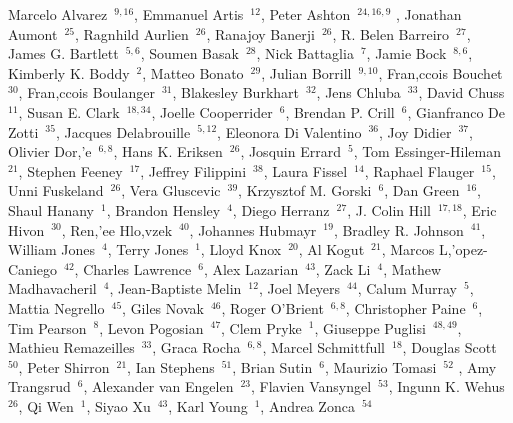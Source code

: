 \documentclass[17pt]{extarticle}
\begin{document}
\small{
Marcelo Alvarez~$^{9,16}$,
Emmanuel Artis~$^{12}$,
Peter Ashton~$^{24,16,9}$ ,
Jonathan Aumont~$^{25}$,
Ragnhild Aurlien~$^{26}$,
Ranajoy Banerji~$^{26}$,
R. Belen Barreiro~$^{27}$,
James G. Bartlett~$^{5,6}$,
Soumen Basak~$^{28}$,
Nick Battaglia~$^{7}$,
Jamie Bock~$^{8,6}$,
Kimberly K. Boddy~$^{2}$,
Matteo Bonato~$^{29}$,
Julian Borrill~$^{9,10}$,
Fran,c{c}ois Bouchet~$^{30}$,
Fran,c{c}ois Boulanger~$^{31}$,
Blakesley Burkhart~$^{32}$,
Jens Chluba~$^{33}$,
David Chuss~$^{11}$,
Susan E. Clark~$^{18,34}$,
Joelle Cooperrider~$^{6}$,
Brendan P. Crill~$^{6}$,
Gianfranco De Zotti~$^{35}$,
Jacques Delabrouille~$^{5,12}$,
Eleonora Di Valentino~$^{36}$,
Joy Didier~$^{37}$,
Olivier Dor,'e~$^{6,8}$,
Hans K. Eriksen~$^{26}$,
Josquin Errard~$^{5}$,
Tom Essinger-Hileman~$^{21}$,
Stephen Feeney~$^{17}$,
Jeffrey Filippini~$^{38}$,
Laura Fissel~$^{14}$,
Raphael Flauger~$^{15}$,
Unni Fuskeland~$^{26}$,
Vera Gluscevic~$^{39}$,
Krzysztof M. Gorski~$^{6}$,
Dan Green~$^{16}$,
Shaul Hanany~$^{1}$,
Brandon Hensley~$^{4}$,
Diego Herranz~$^{27}$,
J. Colin Hill~$^{17,18}$,
Eric Hivon~$^{30}$,
Ren,'{e}e  Hlo,v{z}ek~$^{40}$,
Johannes Hubmayr~$^{19}$,
Bradley R. Johnson~$^{41}$,
William Jones~$^{4}$,
Terry Jones~$^{1}$,
Lloyd Knox~$^{20}$,
Al Kogut~$^{21}$,
Marcos L,'{o}pez-Caniego~$^{42}$,
Charles Lawrence~$^{6}$,
Alex Lazarian~$^{43}$,
Zack Li~$^{4}$,
Mathew Madhavacheril~$^{4}$,
Jean-Baptiste Melin~$^{12}$,
Joel Meyers~$^{44}$,
Calum Murray~$^{5}$,
Mattia Negrello~$^{45}$,
Giles Novak~$^{46}$,
Roger O'Brient~$^{6,8}$,
Christopher Paine~$^{6}$,
Tim Pearson~$^{8}$,
Levon Pogosian~$^{47}$,
Clem Pryke~$^{1}$,
Giuseppe Puglisi~$^{48,49}$,
Mathieu Remazeilles~$^{33}$,
Graca Rocha~$^{6,8}$,
Marcel Schmittfull~$^{18}$,
Douglas Scott~$^{50}$,
Peter Shirron~$^{21}$,
Ian Stephens~$^{51}$,
Brian Sutin~$^{6}$,
Maurizio Tomasi~$^{52}$ ,
Amy Trangsrud~$^{6}$,
Alexander van Engelen~$^{23}$,
Flavien Vansyngel~$^{53}$,
Ingunn K. Wehus~$^{26}$,
Qi Wen~$^{1}$,
Siyao Xu~$^{43}$,
Karl Young~$^{1}$,
Andrea Zonca~$^{54}$
}
\\
\vspace{-6pt} 
\end{document}
